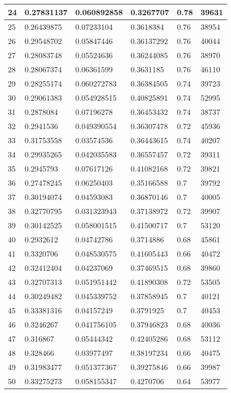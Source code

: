 \begin{longtable}{|l|l|l|l|l|l|}
24 & 0.27831137 & 0.060892858 & 0.3267707 & 0.78 & 39631 \\ \hline 
25 & 0.26439875 & 0.07233104 & 0.3618384 & 0.76 & 38954 \\ \hline 
26 & 0.29548702 & 0.05847446 & 0.36137292 & 0.76 & 40044 \\ \hline 
27 & 0.28083748 & 0.05524636 & 0.36244085 & 0.76 & 38970 \\ \hline 
28 & 0.28067374 & 0.06361599 & 0.3631185 & 0.76 & 46110 \\ \hline 
29 & 0.28255174 & 0.060272783 & 0.36384505 & 0.74 & 39723 \\ \hline 
30 & 0.29061383 & 0.054928515 & 0.40825891 & 0.74 & 52995 \\ \hline 
31 & 0.2878084 & 0.07196278 & 0.36453432 & 0.74 & 38737 \\ \hline 
32 & 0.2941536 & 0.049390554 & 0.36307478 & 0.72 & 45936 \\ \hline 
33 & 0.31753558 & 0.03574536 & 0.36443615 & 0.74 & 40207 \\ \hline 
34 & 0.29935265 & 0.042035583 & 0.36557457 & 0.72 & 39311 \\ \hline 
35 & 0.2945793 & 0.07617126 & 0.41082168 & 0.72 & 39821 \\ \hline 
36 & 0.27478245 & 0.06250403 & 0.35166588 & 0.7 & 39792 \\ \hline 
37 & 0.30194074 & 0.04593083 & 0.36870146 & 0.7 & 40005 \\ \hline 
38 & 0.32770795 & 0.031323943 & 0.37138972 & 0.72 & 39907 \\ \hline 
39 & 0.30142525 & 0.058001515 & 0.41500717 & 0.7 & 53120 \\ \hline 
40 & 0.2932612 & 0.04742786 & 0.3714886 & 0.68 & 45861 \\ \hline 
41 & 0.3320706 & 0.048530575 & 0.41605443 & 0.66 & 40472 \\ \hline 
42 & 0.32412404 & 0.04237069 & 0.37469515 & 0.68 & 39860 \\ \hline 
43 & 0.32707313 & 0.051951442 & 0.41890308 & 0.72 & 53505 \\ \hline 
44 & 0.30249482 & 0.045339752 & 0.37858945 & 0.7 & 40121 \\ \hline 
45 & 0.33381316 & 0.04157249 & 0.3791925 & 0.7 & 40453 \\ \hline 
46 & 0.3246267 & 0.041756105 & 0.37946823 & 0.68 & 40036 \\ \hline 
47 & 0.316867 & 0.05444342 & 0.42405286 & 0.68 & 53112 \\ \hline 
48 & 0.328466 & 0.03977497 & 0.38197234 & 0.66 & 40475 \\ \hline 
49 & 0.31983477 & 0.051377367 & 0.39275846 & 0.66 & 39987 \\ \hline 
50 & 0.33275273 & 0.058155347 & 0.4270706 & 0.64 & 53977 \\ \hline 
\end{longtable}